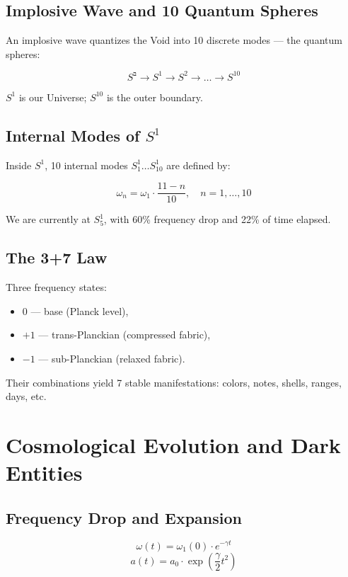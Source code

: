 \documentclass[12pt,a4paper]{article}
\begin{document}
\subsection{Implosive Wave and 10 Quantum Spheres}

An implosive wave quantizes the Void into 10 discrete modes — the quantum spheres:

\[
S^{\text{בּ}} \to S^1 \to S^2 \to \dots \to S^{10}
\]

\(S^1\) is our Universe; \(S^{10}\) is the outer boundary.

\subsection{Internal Modes of \(S^1\)}

Inside \(S^1\), 10 internal modes \(S^1_1 \dots S^1_{10}\) are defined by:

\[
\omega_n = \omega_1 \cdot \frac{11-n}{10}, \quad n = 1, \dots, 10
\]

We are currently at \(S^1_5\), with 60\% frequency drop and 22\% of time elapsed.

\subsection{The 3+7 Law}

Three frequency states:
\begin{itemize}
\item \(0\) — base (Planck level),
\item \(+1\) — trans-Planckian (compressed fabric),
\item \(-1\) — sub-Planckian (relaxed fabric).
\end{itemize}

Their combinations yield 7 stable manifestations: colors, notes, shells, ranges, days, etc.

\section{Cosmological Evolution and Dark Entities}

\subsection{Frequency Drop and Expansion}

\[
\omega(t) = \omega_1(0) \cdot e^{-\gamma t}
\]
\[
a(t) = a_0 \cdot \exp\left(\frac{\gamma}{2} t^2\right)
\]
\end{document}
